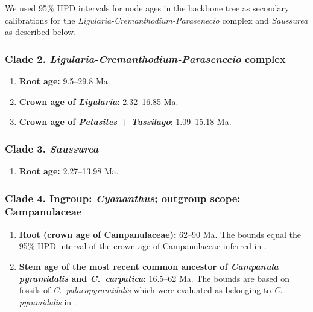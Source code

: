\documentclass[10pt]{article}
\begin{document}
\noindent We used 95\% HPD intervals for node ages in the backbone
tree as secondary calibrations for the
\textit{Ligularia-Cremanthodium-Parasenecio} complex and
\textit{Saussurea} as described below.

\subsubsection*{Clade 2. \textit{Ligularia-Cremanthodium-Parasenecio} complex}

\begin{enumerate}

\item \textbf{Root age:} 9.5--29.8 Ma.

\item \textbf{Crown age of \textit{Ligularia}:} 2.32--16.85 Ma.

\item \textbf{Crown age of \textit{Petasites} + \textit{Tussilago}}:
  1.09--15.18 Ma.

\end{enumerate}

\subsubsection*{Clade 3. \textit{Saussurea}}

\begin{enumerate}
\item \textbf{Root age:} 2.27--13.98 Ma. %
\end{enumerate}

\subsubsection*{Clade 4. Ingroup: \textit{Cyananthus}; outgroup scope: Campanulaceae}

\begin{enumerate}

\item \textbf{Root (crown age of Campanulaceae):} 62--90 Ma. The
  bounds equal the 95\% HPD interval of the crown age of Campanulaceae
  inferred in \cite{Magallon2015}.

\item \textbf{Stem age of the most recent common ancestor of
    \textit{Campanula pyramidalis} and \textit{C.~carpatica}:} 16.5--62
  Ma. The bounds are based on fossils of \textit{C.~palaeopyramidalis}
  \citep{Lancucka-Srodoniowa1979} which were evaluated as belonging to
  \textit{C. pyramidalis} in \cite{Cellinese2009}.
\end{enumerate}
\end{document}

